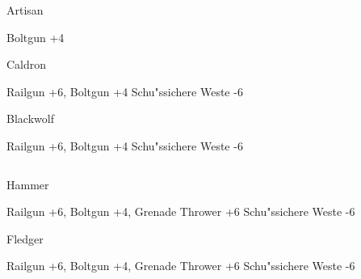 \begin{column}[l]{0.45}
    \begin{nscsheet}[h]{Artisan}
        \nscstats[ATT=5,AGG=5,EMP=8,KNO=8,HP=12]
        \nscruler
        \begin{nscinventory}
            \nscitem[Waffen] Boltgun +4
        \end{nscinventory}
    \end{nscsheet}

    \begin{nscsheet}[h]{Caldron}
        \nscstats[ATT=8,AGG=8,EMP=2,KNO=4,HP=12]
        \nscruler
        \begin{nscinventory}
            \nscitem[Waffen] Railgun +6, Boltgun +4
            \nscitem[R"ustung] Schu"ssichere Weste -6           
        \end{nscinventory}
    \end{nscsheet}

    \begin{nscsheet}[h]{Blackwolf}
        \nscstats[ATT=8,AGG=8,EMP=1,KNO=2,HP=12]
        \nscruler
        \begin{nscinventory}
            \nscitem[Waffen] Railgun +6, Boltgun +4
            \nscitem[R"ustung] Schu"ssichere Weste -6          
        \end{nscinventory}
    \end{nscsheet}    
\end{column}
\begin{column}[r]{0.45}
    \begin{nscsheet}[h]{Hammer}
        \nscstats[ATT=8,AGG=8,EMP=1,KNO=2,HP=12]
        \nscruler
        \begin{nscinventory}
            \nscitem[Waffen] Railgun +6, Boltgun +4, Grenade Thrower +6
            \nscitem[R"ustung] Schu"ssichere Weste -6          
        \end{nscinventory}
    \end{nscsheet}
    
    \begin{nscsheet}[h]{Fledger}
        \nscstats[ATT=8,AGG=8,EMP=1,KNO=2,HP=12]
        \nscruler
        \begin{nscinventory}
            \nscitem[Waffen] Railgun +6, Boltgun +4, Grenade Thrower +6
            \nscitem[R"ustung] Schu"ssichere Weste -6          
        \end{nscinventory}
    \end{nscsheet}    
\end{column}

